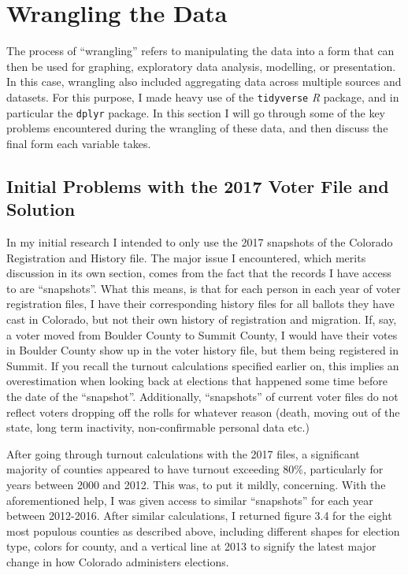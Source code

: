 \documentclass[12pt,twoside]{reedthesis}
\begin{document}
  \section{Wrangling the Data}\label{wrangling-the-data}
  
  The process of ``wrangling'' refers to manipulating the data into a form
  that can then be used for graphing, exploratory data analysis,
  modelling, or presentation. In this case, wrangling also included
  aggregating data across multiple sources and datasets. For this purpose,
  I made heavy use of the \texttt{tidyverse} \textit{R} package, and in
  particular the \texttt{dplyr} package. In this section I will go through
  some of the key problems encountered during the wrangling of these data,
  and then discuss the final form each variable takes.
  
  \subsection{Initial Problems with the 2017 Voter File and
  Solution}\label{initial-problems-with-the-2017-voter-file-and-solution}
  
  In my initial research I intended to only use the 2017 snapshots of the
  Colorado Registration and History file. The major issue I encountered,
  which merits discussion in its own section, comes from the fact that the
  records I have access to are ``snapshots''. What this means, is that for
  each person in each year of voter registration files, I have their
  corresponding history files for all ballots they have cast in Colorado,
  but not their own history of registration and migration. If, say, a
  voter moved from Boulder County to Summit County, I would have their
  votes in Boulder County show up in the voter history file, but them
  being registered in Summit. If you recall the turnout calculations
  specified earlier on, this implies an overestimation when looking back
  at elections that happened some time before the date of the
  ``snapshot''. Additionally, ``snapshots'' of current voter files do not
  reflect voters dropping off the rolls for whatever reason (death, moving
  out of the state, long term inactivity, non-confirmable personal data
  etc.)
  
  After going through turnout calculations with the 2017 files, a
  significant majority of counties appeared to have turnout exceeding
  80\%, particularly for years between 2000 and 2012. This was, to put it
  mildly, concerning. With the aforementioned help, I was given access to
  similar ``snapshots'' for each year between 2012-2016. After similar
  calculations, I returned figure 3.4 for the eight most populous counties
  as described above, including different shapes for election type, colors
  for county, and a vertical line at 2013 to signify the latest major
  change in how Colorado administers elections.
  
\end{document}
